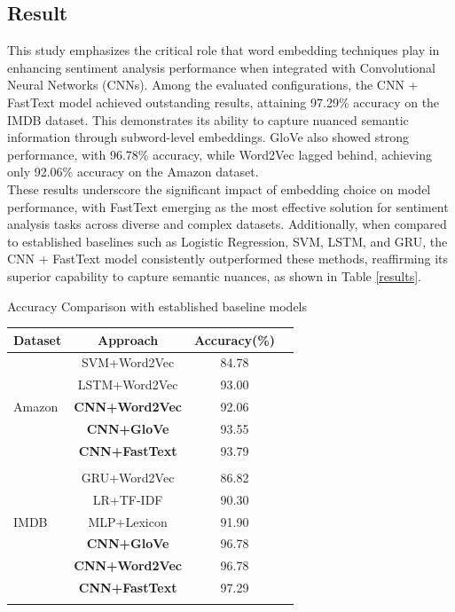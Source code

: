 \documentclass[10pt,a4paper]{article}
\begin{document}
\begin{multicols}{2}
\section*{Result}
This study emphasizes the critical role that word embedding techniques play in enhancing sentiment analysis performance when integrated with Convolutional Neural Networks (CNNs). Among the evaluated configurations, the CNN + FastText model achieved outstanding results, attaining 97.29\% accuracy on the IMDB dataset. This demonstrates its ability to capture nuanced semantic information through subword-level embeddings. GloVe also showed strong performance, with 96.78\% accuracy, while Word2Vec lagged behind, achieving only 92.06\% accuracy on the Amazon dataset.\\
These results underscore the significant impact of embedding choice on model performance, with FastText emerging as the most effective solution for sentiment analysis tasks across diverse and complex datasets. Additionally, when compared to established baselines such as Logistic Regression, SVM, LSTM, and GRU, the CNN + FastText model consistently outperformed these methods, reaffirming its superior capability to capture semantic nuances, as shown in Table \ref{results}.


\begin{threeparttable}[H] 
\caption{Accuracy Comparison with established baseline models}
\begin{tabularx}{.5\textwidth}{@{} l *{3}{C} @{}} 
\toprule
\textbf{Dataset} &\textbf{Approach} & \textbf{Accuracy(\%)}\\
\midrule
&SVM+Word2Vec\cite{wang2024word2vec} & 84.78  \\ \addlinespace
&LSTM+Word2Vec\cite{akinmadenlp} & 93.00  \\ \addlinespace
Amazon&\textbf{CNN+Word2Vec} & 92.06  \\ \addlinespace
& \textbf{CNN+GloVe} & 93.55 \\ \addlinespace
 & \textbf{CNN+FastText}  & 93.79 \\ \addlinespace


&&  \\ \addlinespace

 & GRU+Word2Vec\cite{pandit2024regular} &  86.82 \\ \addlinespace
& LR+TF-IDF\cite{ghosh2022sentiment} &  90.30 \\ \addlinespace
IMDB& MLP+Lexicon\cite{shaukat2020sentiment} &  91.90 \\ \addlinespace
&\textbf{CNN+GloVe} & 96.78 \\ \addlinespace
& \textbf{CNN+Word2Vec} & 96.78  \\ \addlinespace
& \textbf{CNN+FastText}  & 97.29 \\ \addlinespace
\bottomrule
\end{tabularx}


\end{threeparttable}
\end{multicols}
\end{document}
